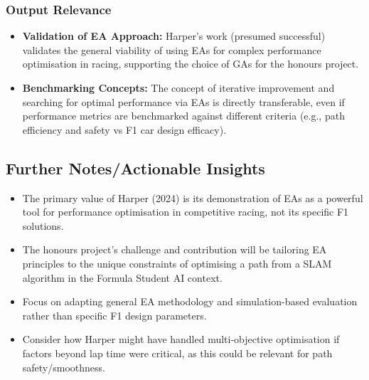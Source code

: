 \subsubsection{Output Relevance}
\begin{itemize}
    \item \textbf{Validation of EA Approach:} Harper’s work (presumed successful) validates the general viability of using EAs for complex performance optimisation in racing, supporting the choice of GAs for the honours project.
    \item \textbf{Benchmarking Concepts:} The concept of iterative improvement and searching for optimal performance via EAs is directly transferable, even if performance metrics are benchmarked against different criteria (e.g., path efficiency and safety vs F1 car design efficacy).
\end{itemize}

\subsection{Further Notes/Actionable Insights}\label{subsec:further-notes/actionable-insights2}
\begin{itemize}
    \item The primary value of Harper (2024) is its demonstration of EAs as a powerful tool for performance optimisation in competitive racing, not its specific F1 solutions.
    \item The honours project's challenge and contribution will be tailoring EA principles to the unique constraints of optimising a path from a SLAM algorithm in the Formula Student AI context.
    \item Focus on adapting general EA methodology and simulation-based evaluation rather than specific F1 design parameters.
    \item Consider how Harper might have handled multi-objective optimisation if factors beyond lap time were critical, as this could be relevant for path safety/smoothness.
\end{itemize}